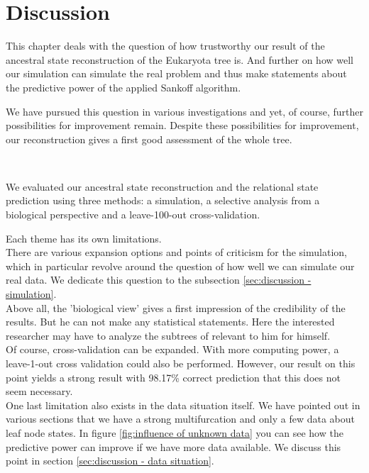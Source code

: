 \chapter{Discussion}
  This chapter deals with the question of how trustworthy our result of the ancestral state 
    reconstruction of the Eukaryota tree is. And further on how well our simulation can simulate the 
    real problem and thus make statements about the predictive power of the applied Sankoff algorithm.

  We have pursued this question in various investigations and yet, of course, further possibilities 
    for improvement remain. Despite these possibilities for improvement, our reconstruction gives a 
    first good assessment of the whole tree.

   \\
  
  We evaluated our ancestral state reconstruction and the relational state prediction using three 
    methods: a simulation, a selective analysis from a biological perspective and a leave-100-out 
    cross-validation.
  
  Each theme has its own limitations. \\
  There are various expansion options and points of criticism for the simulation, which in 
    particular revolve around the question of how well we can simulate our real data. We dedicate 
    this question to the subsection \ref{sec:discussion - simulation}. \\
  Above all, the 'biological view' gives a first impression of the credibility of the results. But 
    he can not make any statistical statements. Here the interested researcher may have to analyze 
    the subtrees of relevant to him for himself. \\
   Of course, cross-validation can be expanded. With more computing power, a leave-1-out cross 
    validation could also be performed. However, our result on this point yields a strong result 
    with 98.17\% correct prediction that this does not seem necessary. \\
  One last limitation also exists in the data situation itself. We have pointed out in various 
    sections that we have a strong multifurcation and only a few data about leaf node states. In 
    figure \ref{fig:influence of unknown data} you can see how the predictive power can improve if 
    we have more data available. We discuss this point in section 
    \ref{sec:discussion - data situation}.

